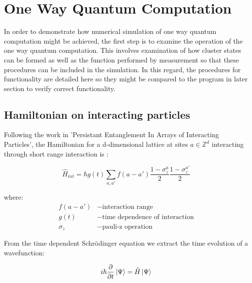 
\chapter{One Way Quantum Computation} %

\label{ch:measurement} %

 In order to demonstrate how numerical simulation of one way quantum computation might be achieved, the first step is to examine the operation of the one way quantum computation. This involves examination of how cluster states can be formed as well as the function performed by measurement so that these procedures can be included in the simulation. In this regard, the procedures for functionality are detailed here so they might be compared to the program in later section to verify correct functionality.


\section{Hamiltonian on interacting particles}
Following the work in 'Persistant Entanglement In Arrays of Interacting Particles', the Hamiltonian for a d-dimensional lattice at sites $a \in \mathbb{Z}^{d}$ interacting through short range interaction is \citep{briegel_persistent_2000}:

\begin{equation}
\label{eq:h_int}
\hat{H} _{int} = \hbar g(t) \sum\limits_{a, a'} f(a - a') \frac{1 - \sigma^{a}_{z}}{2} \frac{1 - \sigma^{a'}_{z}}{2}
\end{equation}

where:
\begin{align*}
f(a - a') &- \mbox{interaction range} \\
g(t) &- \mbox{time dependence of interaction} \\
\sigma_{z} &- \mbox{pauli-z operation}
\end{align*}

From the time dependent Schr\"{o}dinger equation we extract the time evolution of a wavefunction:

\begin{equation}
i\hbar \frac{\partial}{\partial t} \ket{\Psi} = \hat{H} \ket{\Psi}
\end{equation}

